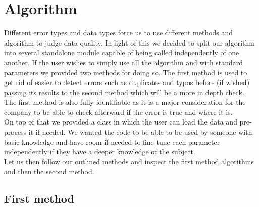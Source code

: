 \documentclass{article}
\begin{document}
\section{Algorithm} %
\label{sec:Algorithm}
Different error types and data types force us to use different methods and algorithm to judge data quality. In light of this we decided to split our algorithm into several standalone module capable of being called independently of one another.
If the user wishes to simply use all the algorithm and with standard parameters we provided two methods for doing so. The first method is used to get rid of easier to detect errors such as duplicates and typos before (if wished) passing its results to the second method which will be a more in depth check. The first method is also fully identifiable as it is a major consideration for the company to be able to check afterward if the error is true and where it is.\\
On top of that we provided a class in which the user can load the data and pre-process it if needed. We wanted the code to be able to be used by someone with basic knowledge and have room if needed to fine tune each parameter independently if they have a deeper knowledge of the subject.\\
Let us then follow our outlined methods and inspect the first method algorithms and then the second method.


\subsection{First method}
\end{document}

